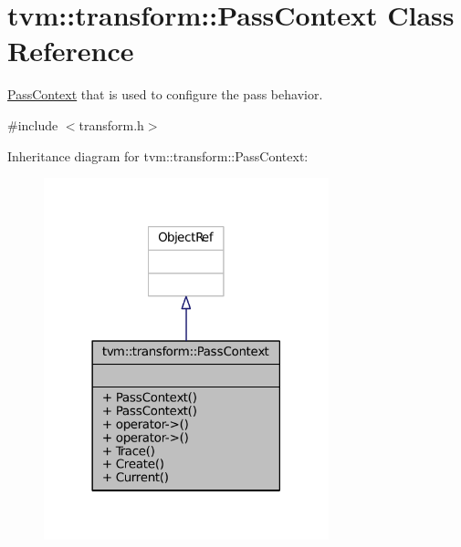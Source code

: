 \hypertarget{classtvm_1_1transform_1_1PassContext}{}\section{tvm\+:\+:transform\+:\+:Pass\+Context Class Reference}
\label{classtvm_1_1transform_1_1PassContext}


\hyperlink{classtvm_1_1transform_1_1PassContext}{Pass\+Context} that is used to configure the pass behavior.  




{\ttfamily \#include $<$transform.\+h$>$}



Inheritance diagram for tvm\+:\+:transform\+:\+:Pass\+Context\+:
\nopagebreak
\begin{figure}[H]
\begin{center}
\leavevmode
\includegraphics[width=234pt]{classtvm_1_1transform_1_1PassContext__inherit__graph}
\end{center}
\end{figure}


